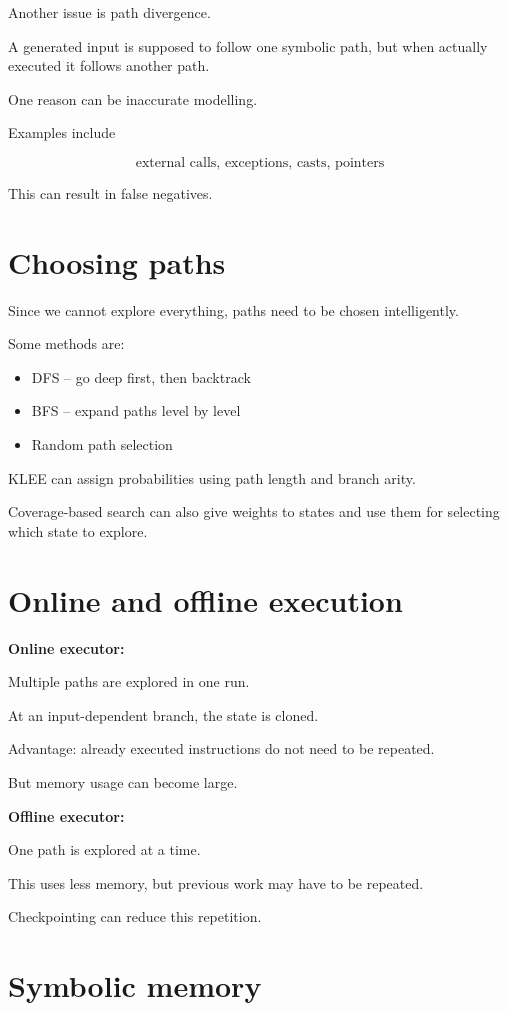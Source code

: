 \documentclass[11pt]{book}
\begin{document}
Another issue is path divergence.

A generated input is supposed to follow one symbolic path,
but when actually executed it follows another path.

One reason can be inaccurate modelling.

Examples include

\[
\text{external calls, exceptions, casts, pointers}
\]

This can result in false negatives.

\section{Choosing paths}

Since we cannot explore everything, paths need to be
chosen intelligently.

Some methods are:

\begin{itemize}
    \item DFS -- go deep first, then backtrack
    \item BFS -- expand paths level by level
    \item Random path selection
\end{itemize}

KLEE can assign probabilities using path length
and branch arity.

Coverage-based search can also give weights to states
and use them for selecting which state to explore.

\section{Online and offline execution}

\textbf{Online executor:}

Multiple paths are explored in one run.

At an input-dependent branch, the state is cloned.

Advantage: already executed instructions do not need
to be repeated.

But memory usage can become large.

\textbf{Offline executor:}

One path is explored at a time.

This uses less memory, but previous work may have to
be repeated.

Checkpointing can reduce this repetition.

\section{Symbolic memory}
\end{document}
